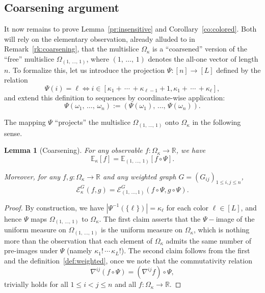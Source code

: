 \documentclass[10pt]{amsart}
\newtheorem{lemm}[theo]{Lemma}\newtheorem{prop}[theo]{Proposition}\newtheorem{coro}[theo]{Corollary}\newtheorem{conj}[theo]{Conjecture}
\theoremstyle{definition}\newtheorem{defi}[theo]{Definition}\newtheorem{rema}[theo]{Remark}\newtheorem{exam}[theo]{Example}\newtheorem{exem}[theo]{Example}\newtheorem{nota}[theo]{Notation}
\newcommand{\R}{\mathbb{R}}
\newcommand{\EE}{\mathbb{E}}
\newcommand{\cE}{\mathcal{E}}
\begin{document}
\subsection{Coarsening argument}\label{sec:colored}
It now remains to prove Lemma~\ref{pr:insensitive} and Corollary~\ref{co:colored}. Both will rely on the elementary observation, already alluded to in Remark~\ref{rk:coarsening}, that the multislice $\Omega_\kappa$ is a ``coarsened'' version of the ``free'' multislice $\Omega_{(1,\,\ldots,\,1)}$, where $(1,\,\ldots,\,1)$ denotes the all-one vector of length $n$. To formalize this, let us introduce the projection $\Psi\colon [n]\to[L]$ defined by the relation
\[
\Psi(i) = \ell \Longleftrightarrow i\in\left[\kappa_1+\,\cdots\,+\kappa_{\ell-1}+1,\kappa_1+\,\cdots\,+\kappa_{\ell}\right],
\]
and extend this definition to sequences by coordinate-wise application:
\[
\Psi(\omega_1,\,\ldots,\,\omega_n) := \left(\Psi(\omega_1),\,\ldots,\,\Psi(\omega_n)\right).
\]

The mapping $\Psi$ ``projects'' the multislice $\Omega_{(1,\,\ldots,\,1)}$ onto $\Omega_\kappa$ in the following sense.
\begin{lemm}[Coarsening]\label{lm:coarsening}
For any observable $f\colon\Omega_\kappa\to\R$, we have
\[\label{isomorphic}
\EE_\kappa\left[f\right] = \EE_{(1,\,\ldots,\,1)}\left[f\circ\Psi\right].
\]

Moreover, for any $f,g\colon\Omega_\kappa\to\R$ and any weighted graph $G=(G_{ij})_{1\le i,j\le n}$,
\[\label{coarsening}
\cE_\kappa^G\left(f,g\right) = \cE_{(1,\,\ldots,1)}^G\left(f\circ\Psi,g\circ\Psi\right).
\]
\end{lemm}

\begin{proof}
By construction, we have $|\Psi^{-1}(\{\ell\})|=\kappa_\ell$ for each color $\ell\in[L]$, and hence $\Psi$ maps $\Omega_{(1,\,\ldots,\,1)}$ to $\Omega_\kappa$. The first claim asserts that the $\Psi-$image of the uniform measure on $\Omega_{(1,\,\ldots,\,1)}$ is the uniform measure on $\Omega_\kappa$, which is nothing more than the observation that each element of $\Omega_\kappa$ admits the same number of pre-images under $\Psi$ (namely $\kappa_1!\,\cdots\,\kappa_L!$). The second claim follows from the first and the definition~\eqref{def:weighted}, once we note that the commutativity relation
\[
\nabla^{ij}\left(f\circ\Psi\right) = \left(\nabla^{ij}f\right)\circ\Psi,
\]
trivially holds for all $1\le i<j\le n$ and all $f\colon\Omega_\kappa\to\R$.
\end{proof}
\end{document}

